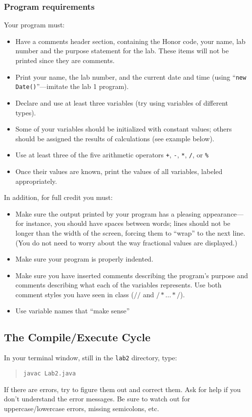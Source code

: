 \subsubsection*{Program requirements}
\noindent Your program must:
\begin{itemize}
\item
Have a  comments header section, containing the Honor code, your name, lab number and the purpose statement for the lab. These items will not be printed since they are comments.
\item
Print your name, the lab number, and the current date and time (using
``{\tt new Date()}''---imitate the lab 1 program).
\item
Declare and use at least three variables (try using variables of different types).
\item
Some of your variables should be initialized with constant values; others
should be assigned the results of calculations (see example below). 
\item
Use at least three of the five arithmetic operators \verb$+$, \verb$-$, \verb$*$,
\verb$/$, or \verb$%$
\item
Once their values are known, print the values of all variables, labeled appropriately. 
\end{itemize}


\noindent In addition, for full credit you must:
\begin{itemize}
\item
Make sure the output printed by your program has a
pleasing appearance---for instance, you should have spaces between words;
lines should not be longer than the width of the screen, forcing them to ``wrap''
to the next line. (You do not need to worry about the way
fractional values are displayed.)
\item
Make sure your program is properly indented.
\item
Make sure you have inserted comments describing the program's purpose and
comments describing what each of the variables represents. Use both comment styles you have seen in class ($//$ and $/* ...   */$).
\item
Use variable names that ``make sense''
\end{itemize}


\subsection*{The Compile/Execute Cycle}
In your terminal window, still in the {\tt lab2} directory, type:
\begin{quote}
{\tt javac Lab2.java} 
\end{quote}
If there are errors, try to figure them out and correct them. Ask for help if
you don't understand the error messages. Be sure to watch out for
uppercase/lowercase errors, missing semicolons, etc.

